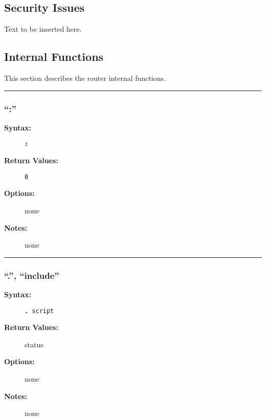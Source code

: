 \subsection{Security Issues}

Text to be inserted here.




\subsection{Internal Functions}

This section describes the router internal functions.

\hrule
\subsubsection{``:''}

\begin{description}
\item[{\bf Syntax:}] \mbox{}

{\tt {\bf :}}

\item[{\bf Return Values:}] \mbox{}

\begin{description}
\item[{\tt 0}] \mbox{}



\end{description}


\item[{\bf Options:}] \mbox{}

none  

\item[{\bf Notes:}] \mbox{}

none

\end{description}


\hrule
\subsubsection{``.'', ``include''}

\begin{description}
\item[{\bf Syntax:}] \mbox{}

{\tt {\bf .} script}

\item[{\bf Return Values:}] \mbox{}

status

\item[{\bf Options:}] \mbox{}

none  

\item[{\bf Notes:}] \mbox{}

none

\end{description}


